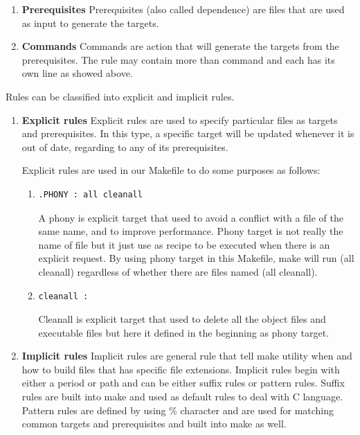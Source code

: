 \documentclass[11pt]{report}
\begin{document}
\begin{enumerate}
\begin{enumerate}
\item \textbf{Prerequisites} Prerequisites (also called dependence) are files that are used as input to generate the targets.

\item \textbf{Commands} Commands are action that will generate the targets from the prerequisites. The rule may contain more than command and each has its own line as showed above.
\end{enumerate}

Rules can be classified into explicit and implicit rules. 
\begin{enumerate}
\item \textbf{Explicit rules} Explicit rules are used to specify particular files as targets and prerequisites. In this type, a specific target will be updated whenever it is out of date, regarding to any of its prerequisites.

Explicit rules are used in our Makefile to do some purposes as follows:
\begin{enumerate}
\item \begin{verbatim}
.PHONY : all cleanall
\end{verbatim}
A phony is explicit target that used to avoid a conflict with a file of the same name, and to improve performance. Phony target is not really the name of file but it just use as recipe to be executed when there is an explicit request. By using phony target in this Makefile, make will run (all cleanall) regardless of whether there are files named (all cleanall).

\item \begin{verbatim}
cleanall :
\end{verbatim}
Cleanall is explicit target that used to delete all the object files and executable files but here it defined in the beginning as phony target.
\end{enumerate}

\item \textbf{Implicit rules} Implicit rules are general rule that tell make utility when and how to build files that has specific file extensions. Implicit rules begin with either a period or path and can be either suffix rules or pattern rules. Suffix rules are built into make and used as default rules to deal with C language.  Pattern rules are defined by using \% character and are used for matching common targets and prerequisites and built into make as well.


\end{enumerate}
\end{enumerate}
\end{document}
